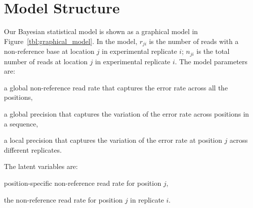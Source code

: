\documentclass[11pt,reqno]{amsart}
\begin{document}
\section{Model Structure}
Our Bayesian statistical model is shown as a graphical model in Figure~\ref{tbl:graphical_model}.
In the model, $r_{ji}$ is the number of reads with a non-reference base at location $j$ in experimental replicate $i$; $n_{ji}$ is the total number of reads at location $j$ in experimental replicate $i$.
The model parameters are:
\begin{description}[noitemsep]
  \item[$\mu_0$] a global non-reference read rate that captures the error rate across all the positions,
  \item[$M_0$] a global precision that captures the variation of the error rate across positions in a sequence,
  \item[$M_j$] a local precision that captures the variation of the error rate at position $j$ across different replicates.
\end{description}
The latent variables are:
\begin{description}[noitemsep]
  \item[$\mu_j \sim \text{Beta}(\mu_0)$] position-specific non-reference read rate for position $j$,
  \item[$\theta_{ji} \sim \text{Multi}(1, \mu_j)$] the non-reference read rate for position $j$ in replicate $i$.
\end{description}
\end{document}
